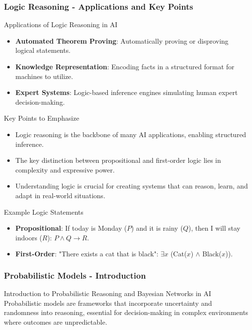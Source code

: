 \documentclass[aspectratio=169]{beamer}
\begin{document}
\begin{frame}[fragile]
    \frametitle{Logic Reasoning - Applications and Key Points}
    \begin{block}{Applications of Logic Reasoning in AI}
        \begin{itemize}
            \item \textbf{Automated Theorem Proving}: Automatically proving or disproving logical statements.
            \item \textbf{Knowledge Representation}: Encoding facts in a structured format for machines to utilize.
            \item \textbf{Expert Systems}: Logic-based inference engines simulating human expert decision-making.
        \end{itemize}
    \end{block}

    \begin{block}{Key Points to Emphasize}
        \begin{itemize}
            \item Logic reasoning is the backbone of many AI applications, enabling structured inference.
            \item The key distinction between propositional and first-order logic lies in complexity and expressive power.
            \item Understanding logic is crucial for creating systems that can reason, learn, and adapt in real-world situations.
        \end{itemize}
    \end{block}

    \begin{block}{Example Logic Statements}
        \begin{itemize}
            \item \textbf{Propositional}: If today is Monday ($P$) and it is rainy ($Q$), then I will stay indoors ($R$): $P \land Q \rightarrow R$.
            \item \textbf{First-Order}: "There exists a cat that is black": $\exists x$ (Cat($x$) $\land$ Black($x$)).
        \end{itemize}
    \end{block}
\end{frame}

\begin{frame}[fragile]
    \frametitle{Probabilistic Models - Introduction}
    \begin{block}{Introduction to Probabilistic Reasoning and Bayesian Networks in AI}
        Probabilistic models are frameworks that incorporate uncertainty and randomness into reasoning, essential for decision-making in complex environments where outcomes are unpredictable.
    \end{block}
\end{frame}
\end{document}

